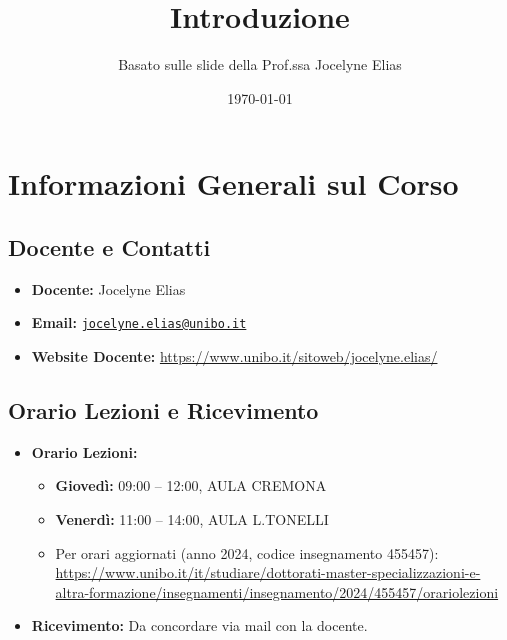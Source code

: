 

\title{Introduzione}
\author{Basato sulle slide della Prof.ssa Jocelyne Elias}
\date{\today}



\maketitle
\tableofcontents
\newpage

\section{Informazioni Generali sul Corso}

\subsection{Docente e Contatti}
\begin{itemize}
    \item \textbf{Docente:} Jocelyne Elias
    \item \textbf{Email:} \href{mailto:jocelyne.elias@unibo.it}{\texttt{jocelyne.elias@unibo.it}}
    \item \textbf{Website Docente:} \url{https://www.unibo.it/sitoweb/jocelyne.elias/}
\end{itemize}

\subsection{Orario Lezioni e Ricevimento}
\begin{itemize}
    \item \textbf{Orario Lezioni:}
    \begin{itemize}
        \item \textbf{Giovedì:} 09:00 – 12:00, AULA CREMONA
        \item \textbf{Venerdì:} 11:00 – 14:00, AULA L.TONELLI
        \item Per orari aggiornati (anno 2024, codice insegnamento 455457):\\ \url{https://www.unibo.it/it/studiare/dottorati-master-specializzazioni-e-altra-formazione/insegnamenti/insegnamento/2024/455457/orariolezioni}
    \end{itemize}
    \item \textbf{Ricevimento:} Da concordare via mail con la docente.
\end{itemize}

